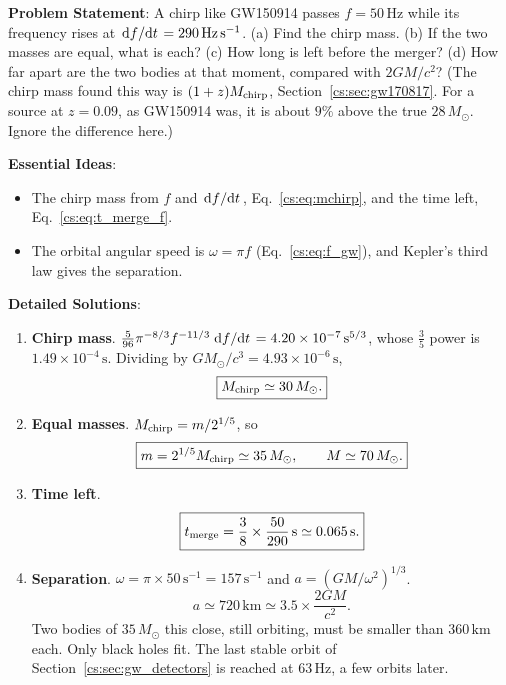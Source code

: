 \textbf{Problem Statement}: A chirp like GW150914 passes $f=50\,\mathrm{Hz}$ while its frequency rises at $\dv*{f}{t}=290\,\mathrm{Hz\,s^{-1}}$. (a) Find the chirp mass. (b) If the two masses are equal, what is each? (c) How long is left before the merger? (d) How far apart are the two bodies at that moment, compared with $2GM/c^2$? (The chirp mass found this way is $(1+z)M_{\rm chirp}$, Section~\ref{cs:sec:gw170817}. For a source at $z=0.09$, as GW150914 was, it is about $9\%$ above the true $28\,M_\odot$. Ignore the difference here.)

\textbf{Essential Ideas}:
\begin{itemize}
	\item The chirp mass from $f$ and $\dv*{f}{t}$, Eq.~\eqref{cs:eq:mchirp}, and the time left, Eq.~\eqref{cs:eq:t_merge_f}.
	\item The orbital angular speed is $\omega=\pi f$ (Eq.~\eqref{cs:eq:f_gw}), and Kepler's third law gives the separation.
\end{itemize}

\textbf{Detailed Solutions}:
\begin{enumerate}[label=(\alph*)]
	\item \textbf{Chirp mass}. $\tfrac{5}{96}\pi^{-8/3}f^{-11/3}\dv*{f}{t}=4.20\times10^{-7}\,\mathrm s^{5/3}$, whose $\tfrac35$ power is $1.49\times10^{-4}\,\mathrm s$. Dividing by $GM_\odot/c^3=4.93\times10^{-6}\,\mathrm s$,
	\[
	\boxed{M_{\rm chirp}\simeq30\,M_\odot.}
	\]
	\item \textbf{Equal masses}. $M_{\rm chirp}=m/2^{1/5}$, so
	\[
	\boxed{m=2^{1/5}M_{\rm chirp}\simeq35\,M_\odot,\qquad M\simeq70\,M_\odot.}
	\]
	\item \textbf{Time left}.
	\[
	\boxed{t_{\rm merge}=\frac38\times\frac{50}{290}\,\mathrm s\simeq0.065\,\mathrm s.}
	\]
	\item \textbf{Separation}. $\omega=\pi\times50\,\mathrm{s^{-1}}=157\,\mathrm{s^{-1}}$ and $a=(GM/\omega^2)^{1/3}$.
	\[
	\boxed{a\simeq720\,\mathrm{km}\simeq3.5\times\frac{2GM}{c^2}.}
	\]
	Two bodies of $35\,M_\odot$ this close, still orbiting, must be smaller than $360\,\mathrm{km}$ each. Only black holes fit. The last stable orbit of Section~\ref{cs:sec:gw_detectors} is reached at $63\,\mathrm{Hz}$, a few orbits later.
\end{enumerate}
